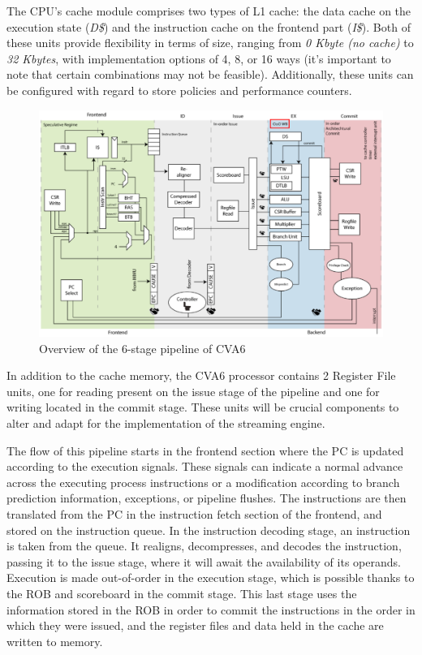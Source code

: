 The CPU's cache module comprises two types of L1 cache: the data cache on the execution state (\textit{D\$}) and the instruction cache on the frontend part (\textit{I\$}). Both of these units provide flexibility in terms of size, ranging from \textit{0 Kbyte (no cache)} to \textit{32 Kbytes}, with implementation options of 4, 8, or 16 ways (it's important to note that certain combinations may not be feasible). Additionally, these units can be configured with regard to store policies and performance counters.

\begin{figure}[H]
    \centering
    \includegraphics[width=0.75\linewidth]{images/cva6-simplified-overview.png}
    \caption{Overview of the 6-stage pipeline of CVA6}
    \label{fig:cva6-pipeline}
\end{figure}

In addition to the cache memory, the CVA6 processor contains 2 Register File units, one for reading present on the issue stage of the pipeline and one for writing located in the commit stage. These units will be crucial components to alter and adapt for the implementation of the streaming engine.

The flow of this pipeline starts in the frontend section where the \acrfull{PC} is updated according to the execution signals. These signals can indicate a normal advance across the executing process instructions or a modification according to branch prediction information, exceptions, or pipeline flushes. The instructions are then translated from the \acrshort{PC} in the instruction fetch section of the frontend, and stored on the instruction queue. In the instruction decoding stage, an instruction is taken from the queue. It realigns, decompresses, and decodes the instruction, passing it to the issue stage, where it will await the availability of its operands. Execution is made out-of-order in the execution stage, which is possible thanks to the \acrfull{ROB} and scoreboard in the commit stage. This last stage uses the information stored in the \acrshort{ROB} in order to commit the instructions in the order in which they were issued, and the register files and data held in the cache are written to memory.


